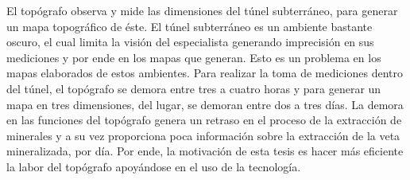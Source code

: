 El topógrafo observa y mide las dimensiones del túnel subterráneo, para generar un mapa 
topográfico de éste. El túnel subterráneo es un ambiente bastante oscuro, el 
cual limita la visión del especialista generando imprecisión en sus mediciones y por ende en 
los mapas que generan. Esto es un problema en los mapas elaborados de estos ambientes. Para 
realizar la toma de mediciones dentro del túnel, el topógrafo se demora entre tres a cuatro 
horas y para generar un mapa en tres dimensiones, del lugar, se demoran entre dos a tres 
días. La demora en las funciones del topógrafo genera un retraso en el proceso de la extracción 
de minerales y a su vez proporciona poca información sobre la extracción de la veta 
mineralizada, por día. Por ende, la motivación de esta tesis es hacer más eficiente la 
labor del topógrafo apoyándose en el uso de la tecnología. 






